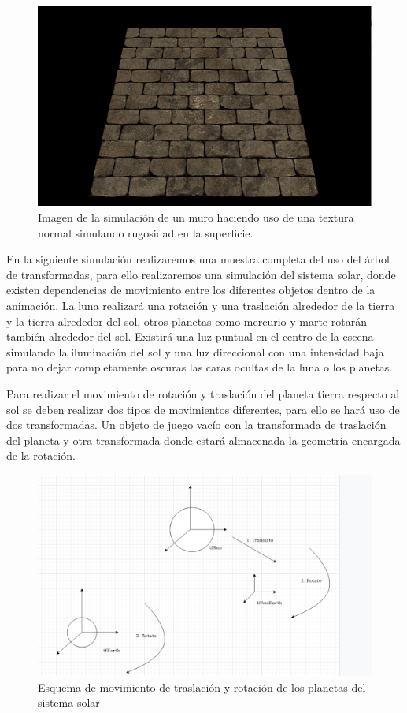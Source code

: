 \documentclass[a4paper, 17pt]{book}
\begin{document}
\begin{figure}[hbt!]
    \centering
    \includegraphics[scale=0.75, keepaspectratio]{img/WallResult.png}
    \caption{Imagen de la simulación de un muro haciendo uso de una textura normal simulando rugosidad en la superficie.}
    \label{figura:WallResult}
\end{figure}

En la siguiente simulación realizaremos una muestra completa del uso del árbol de transformadas, para ello realizaremos
una simulación del sistema solar, donde existen dependencias de movimiento entre los diferentes objetos dentro de la
animación. La luna realizará una rotación y una traslación alrededor de la tierra y la tierra alrededor del sol, otros
planetas como mercurio y marte rotarán también alrededor del sol. Existirá una luz puntual en el centro de la escena
simulando la  iluminación del sol y una luz direccional con una intensidad baja para no dejar completamente oscuras
las caras ocultas de la luna o los planetas.

Para realizar el movimiento de rotación y traslación del planeta tierra respecto al sol se deben realizar dos tipos de
movimientos diferentes, para ello se hará uso de dos transformadas. Un objeto de juego vacío con la transformada de
traslación del planeta y otra transformada donde estará almacenada la geometría encargada de la rotación.

\begin{figure}[hbt!]
    \centering
    \includegraphics[scale=0.50, keepaspectratio]{img/SolarMove.png}
    \caption{Esquema de movimiento de traslación y rotación de los planetas del sistema solar}
    \label{figura:SolarMove}
\end{figure}
\end{document}

